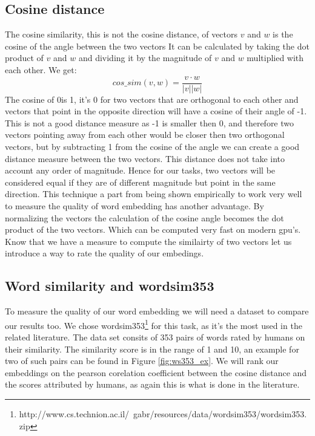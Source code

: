 \subsection{Cosine distance}
The cosine similarity, this is not the cosine distance, of vectors $v$ and $w$ is the cosine of the angle between the two vectors It can be calculated by taking the dot product of $v$ and $w$ and dividing it by the magnitude of $v$ and $w$ multiplied with each other. We get:
\begin{equation}
cos\_sim(v,w) = \frac{v \cdot w}{|v| |w|} 
\end{equation}
The cosine of 0\textdegree is 1,  it's 0 for two vectors that are orthogonal to each other and vectors that point in the opposite direction will have a cosine of their angle of -1. This is not a good distance measure as -1 is smaller then 0, and therefore two vectors pointing away from each other would be closer then two orthogonal vectors, but by subtracting 1 from the cosine of the angle we can create a good distance measure  between the two vectors. This distance does not take into account any order of magnitude. Hence for our tasks, two vectors will be considered equal if they are of different magnitude but point in the same direction. 
This technique a part from being shown empirically to work very well to measure the quality of word embedding has another advantage. By normalizing the vectors the calculation of the cosine angle becomes the dot product of the two vectors. Which can be computed very fast on modern gpu's. 
Know that we have a measure to compute the similairty of two vectors let us introduce a way to rate the quality of our embedings.


\subsection{Word similarity and wordsim353}
To measure the quality of our word embedding we will need a dataset to compare our results too. We chose  wordsim353\footnote{http://www.cs.technion.ac.il/~gabr/resources/data/wordsim353/wordsim353.zip} for this task, as it's the most used in the related literature. The data set consits of 353 pairs of words rated by humans on their similarity. The similarity score is in the range of 1 and 10, an example for two of such pairs can be found in Figure \ref{fig:ws353_ex}. We will rank our embeddings on the pearson corelation coefficient between the cosine distance and the scores attributed by humans, as again this is what is done in the literature. 

